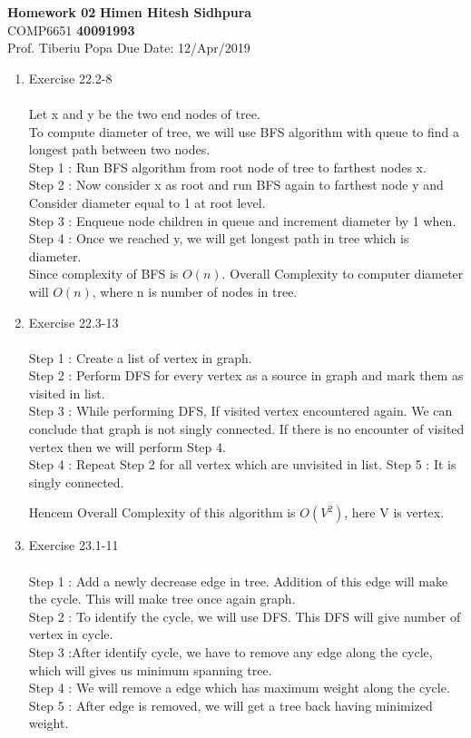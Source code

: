 \documentclass{article}
\begin{document}
\noindent
\large\textbf{Homework 02} \hfill \textbf{Himen Hitesh Sidhpura} \\
\normalsize COMP6651 \hfill \textbf{40091993} \\
Prof. Tiberiu Popa \hfill Due Date: 12/Apr/2019 \\

\begin{enumerate}
    \item Exercise 22.2-8  \\ \\
    Let x and  y be the two end nodes of tree.\\
    To compute diameter of tree, we will use BFS algorithm with queue to find a  longest path between two nodes.\\
    Step 1 : Run BFS algorithm from root node of tree to farthest nodes x. \\
    Step 2 : Now consider x as root and run BFS again to farthest node y and Consider diameter equal to 1 at root level.\\
    Step 3 : Enqueue node children in queue and increment diameter by 1 when. \\
    Step 4 : Once we reached y, we will get longest path in tree which is diameter. \\
    Since complexity of BFS is $O(n)$. Overall Complexity to computer diameter will $O(n)$, where n is number of nodes in  tree.\\
    \item Exercise 22.3-13\\ \\
    Step 1 : Create a list of vertex in graph.\\
    Step 2 : Perform DFS for every vertex as a source in graph and mark them as visited in list.\\
    Step 3 : While performing DFS, If visited vertex encountered again. We can conclude that graph is not singly connected. If there is no encounter of visited vertex then we will perform Step 4. \\
    Step 4 : Repeat Step 2 for all vertex which are unvisited in list.
    Step 5 : It is singly connected.
    
    Hencem Overall Complexity of this algorithm is $O(V^2)$, here V is vertex.
    
    \item Exercise 23.1-11\\ \\
    Step 1 : Add a newly decrease edge in tree. Addition of this edge will make the cycle. This will make tree once again graph.\\
    Step 2 : To identify the cycle, we will use DFS. This DFS will give number of vertex in cycle. \\
    Step 3 :After identify cycle, we have to remove any edge along the cycle, which will gives us minimum spanning tree.\\
    Step 4 : We will remove a edge which  has maximum weight along the cycle.\\
    Step 5 : After edge is removed, we will get a tree back having minimized weight.\\
    

\end{enumerate}
\end{document}
